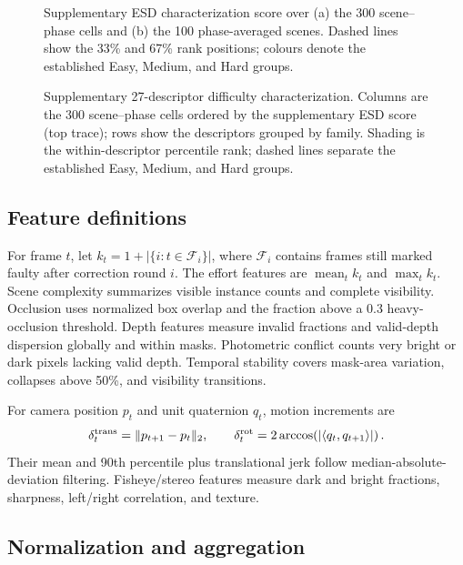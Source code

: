 

\begin{figure}[t]
\centering
\FigESD
\caption{Supplementary ESD characterization score over (a) the 300 scene--phase cells and (b) the 100 phase-averaged scenes. Dashed lines show the 33\% and 67\% rank positions; colours denote the established Easy, Medium, and Hard groups.}
\label{fig:appendix-esd-distributions}
\end{figure}

\begin{figure}[t]
\centering

\caption{Supplementary 27-descriptor difficulty characterization. Columns are the 300 scene--phase cells ordered by the supplementary ESD score (top trace); rows show the descriptors grouped by family. Shading is the within-descriptor percentile rank; dashed lines separate the established Easy, Medium, and Hard groups.}
\label{fig:appendix-esd-heatmap}
\end{figure}

\subsection{Feature definitions}

For frame $t$, let $k_t=1+|\{i:t\in\mathcal F_i\}|$, where $\mathcal F_i$ contains frames still marked faulty after correction round $i$. The effort features are $\operatorname{mean}_t k_t$ and $\max_t k_t$. Scene complexity summarizes visible instance counts and complete visibility. Occlusion uses normalized box overlap and the fraction above a 0.3 heavy-occlusion threshold. Depth features measure invalid fractions and valid-depth dispersion globally and within masks. Photometric conflict counts very bright or dark pixels lacking valid depth. Temporal stability covers mask-area variation, collapses above 50\%, and visibility transitions.


For camera position $p_t$ and unit quaternion $q_t$, motion increments are
\begin{equation}
\delta_t^{\rm trans}=\|p_{t+1}-p_t\|_2,\qquad
\delta_t^{\rm rot}=2\arccos\!\left(|\langle q_t,q_{t+1}\rangle|\right).
\end{equation}
Their mean and 90th percentile plus translational jerk follow median-absolute-deviation filtering. Fisheye/stereo features measure dark and bright fractions, sharpness, left/right correlation, and texture.

\subsection{Normalization and aggregation}

